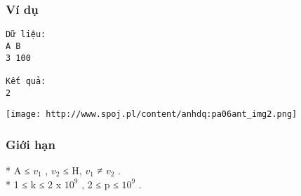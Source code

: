 \subsubsection{   Ví dụ  }
\begin{verbatim}
Dữ liệu:
A B
3 100

Kết quả:
2
\end{verbatim}


\texttt{[image: http://www.spoj.pl/content/anhdq:pa06ant\_img2.png]}



\subsubsection{   Giới hạn  }

   * A ≤ $v_{1}$   , $v_{2}$   ≤ H, $v_{1}$   ≠ $v_{2}$   .   
\\   * 1 ≤ k ≤ 2 x $10^{9}$   , 2 ≤ p ≤ $10^{9}$   .   
\\
